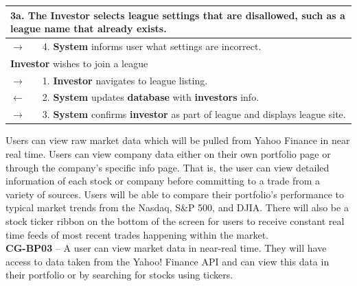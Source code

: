 \begin{centering}
\begin{longtable}{|p{1.2in} p{5in}|}
\multicolumn{2}{|p{6.2in}|}{3a. The \textbf{Investor} selects league settings that are disallowed,
such as a league name that already exists.} \\ \hline

$\rightarrow$ & 4. \textbf{System} informs user what settings are incorrect.\\ \hline

\multicolumn{2}{|p{6.2in}|}{\textbf{Investor} wishes to join a league} \\
\hline

$\rightarrow$ & 1. \textbf{Investor} navigates to league listing.\\
$\leftarrow$ & 2. \textbf{System} updates \textbf{database} with \textbf{investors} info.\\
$\rightarrow$ & 3. \textbf{System} confirms \textbf{investor} as part of league and displays
league site.\\
\hline
\end{longtable}
\end{centering}

Users can view raw market data which will be pulled from Yahoo Finance in near real time.
Users can view company data either on their own portfolio page or through the company’s
specific info page. That is, the user can view detailed information of each stock or company
before committing to a trade from a variety of sources. Users will be able to compare their
portfolio’s performance to typical market trends from the Nasdaq, S\&P 500, and DJIA. There
will also be a stock ticker ribbon on the bottom of the screen for users to receive constant
real time feeds of most recent trades happening within the market.\\

\textbf{CG-BP03} – A user can view market data in near-real time. They will have access to data
taken from the Yahoo! Finance API and can view this data in their portfolio or by searching
for stocks using tickers. \\

